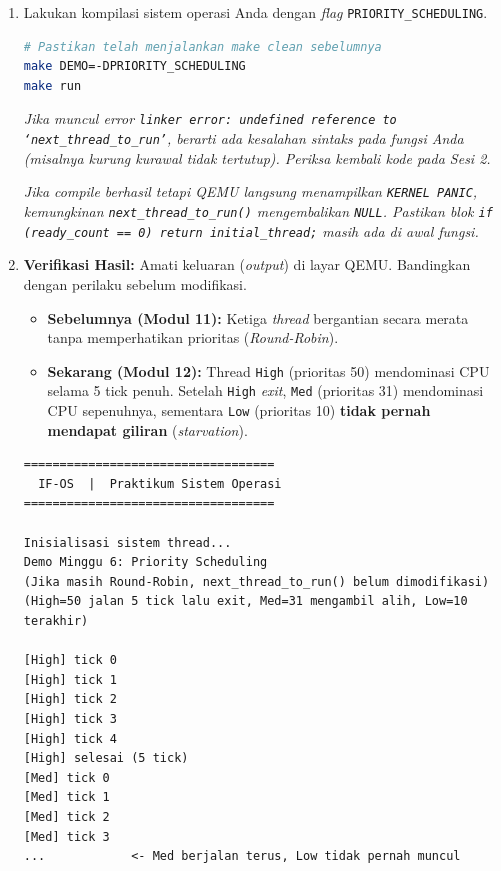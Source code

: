 \begin{enumerate}
	\item Lakukan kompilasi sistem operasi Anda dengan \textit{flag} \texttt{PRIORITY\_SCHEDULING}.
	      \begin{lstlisting}[language=bash, caption={Compile dan jalankan dengan Priority Scheduling}]
# Pastikan telah menjalankan make clean sebelumnya
make DEMO=-DPRIORITY_SCHEDULING
make run
    \end{lstlisting}

	      \textit{Jika muncul error \texttt{linker error: undefined reference to `next\_thread\_to\_run'}, berarti ada kesalahan sintaks pada fungsi Anda (misalnya kurung kurawal tidak tertutup). Periksa kembali kode pada Sesi 2.}

	      \textit{Jika compile berhasil tetapi QEMU langsung menampilkan \texttt{KERNEL PANIC}, kemungkinan \texttt{next\_thread\_to\_run()} mengembalikan \texttt{NULL}. Pastikan blok \texttt{if (ready\_count == 0) return initial\_thread;} masih ada di awal fungsi.}

	\item \textbf{Verifikasi Hasil:} Amati keluaran (\textit{output}) di layar QEMU. Bandingkan dengan perilaku sebelum modifikasi.
	      \begin{itemize}
		      \item \textbf{Sebelumnya (Modul 11):} Ketiga \textit{thread} bergantian secara merata tanpa memperhatikan prioritas (\textit{Round-Robin}).
		      \item \textbf{Sekarang (Modul 12):} Thread \texttt{High} (prioritas 50) mendominasi CPU selama 5 tick penuh. Setelah \texttt{High} \textit{exit}, \texttt{Med} (prioritas 31) mendominasi CPU sepenuhnya, sementara \texttt{Low} (prioritas 10) \textbf{tidak pernah mendapat giliran} (\textit{starvation}).
	      \end{itemize}

	      \begin{lstlisting}[caption={Ekspektasi keluaran QEMU setelah Priority Scheduling}]
===================================
  IF-OS  |  Praktikum Sistem Operasi
===================================

Inisialisasi sistem thread...
Demo Minggu 6: Priority Scheduling
(Jika masih Round-Robin, next_thread_to_run() belum dimodifikasi)
(High=50 jalan 5 tick lalu exit, Med=31 mengambil alih, Low=10 terakhir)

[High] tick 0
[High] tick 1
[High] tick 2
[High] tick 3
[High] tick 4
[High] selesai (5 tick)
[Med] tick 0
[Med] tick 1
[Med] tick 2
[Med] tick 3
...            <- Med berjalan terus, Low tidak pernah muncul
    \end{lstlisting}


\end{enumerate}
